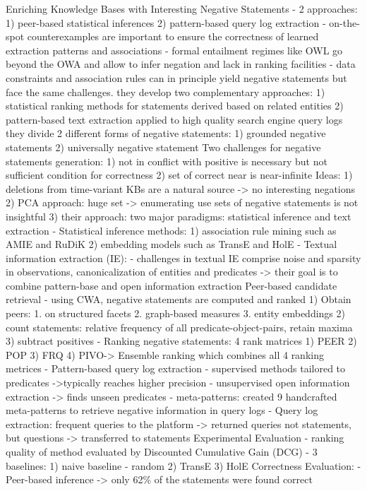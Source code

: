 \cite{arnaout2020enriching}
Enriching Knowledge Bases with Interesting Negative Statements
- 2 approaches:
1) peer-based statistical inferences
2) pattern-based query log extraction
- on-the-spot counterexamples are important to ensure the correctness of learned extraction patterns and associations
- formal entailment regimes like OWL go beyond the OWA and allow to infer negation and lack in ranking facilities
- data constraints and association rules can in principle yield negative statements but face the same challenges.
they develop two complementary approaches:
    1) statistical ranking methods for statements derived based on related entities
    2) pattern-based text extraction applied to high quality search engine query logs
they divide 2 different forms of negative statements:
    1) grounded negative statements
    2) universally negative statement
Two challenges for negative statements generation:
    1) not in conflict with positive is necessary but not sufficient condition for correctness
    2) set of correct near is near-infinite
Ideas:
    1) deletions from time-variant KBs are a natural source -> no interesting negations
    2) PCA approach: huge set -> enumerating use sets of negative statements is not insightful
    3) their approach: two major paradigms: statistical inference and text extraction
- Statistical inference methods: 
    1) association rule mining such as AMIE and RuDiK
    2) embedding models such as TransE and HolE
- Textual information extraction (IE):
    - challenges in textual IE comprise noise and sparsity in observations, canonicalization of entities and predicates
    -> their goal is to combine pattern-base and open information extraction
Peer-based candidate retrieval
- using CWA, negative statements are computed and ranked
    1) Obtain peers: 1. on structured facets 2. graph-based measures 3. entity embeddings
    2) count statements: relative frequency of all predicate-object-pairs, retain maxima
    3) subtract positives
- Ranking negative statements: 4 rank matrices
    1) PEER 2) POP 3) FRQ 4) PIVO-> Ensemble ranking which combines all 4 ranking metrices
- Pattern-based query log extraction
    - supervised methods tailored to predicates ->typically reaches higher precision
    - unsupervised open information extraction -> finds unseen predicates
    - meta-patterns: created 9 handcrafted meta-patterns to retrieve negative information in query logs
    - Query log extraction: frequent queries to the platform -> returned queries not statements, but questions -> transferred to statements
Experimental Evaluation
- ranking quality of method evaluated by Discounted Cumulative Gain (DCG)
- 3 baselines: 1) naive baseline - random 2) TransE 3) HolE
Correctness Evaluation:
- Peer-based inference
    -> only 62\% of the statements were found correct

